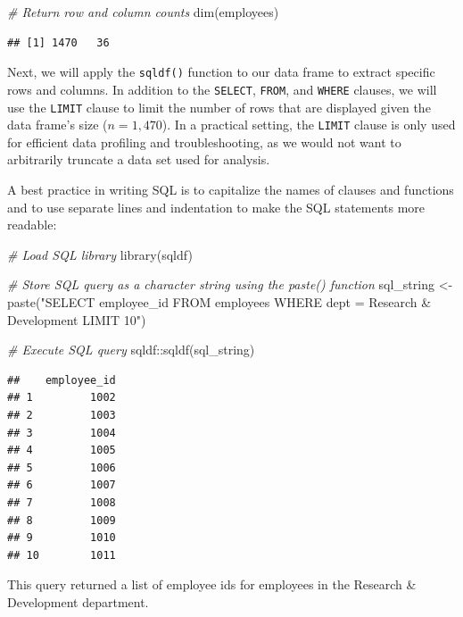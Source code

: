 \documentclass[
]{book}
\newenvironment{Shaded}{\begin{snugshade}}{\end{snugshade}}
\newcommand{\CommentTok}[1]{\textcolor[rgb]{0.56,0.35,0.01}{\textit{#1}}}
\newcommand{\FunctionTok}[1]{\textcolor[rgb]{0.00,0.00,0.00}{#1}}
\newcommand{\NormalTok}[1]{#1}
\newcommand{\OtherTok}[1]{\textcolor[rgb]{0.56,0.35,0.01}{#1}}
\newcommand{\SpecialCharTok}[1]{\textcolor[rgb]{0.00,0.00,0.00}{#1}}
\newcommand{\StringTok}[1]{\textcolor[rgb]{0.31,0.60,0.02}{#1}}
\begin{document}
\begin{Shaded}
\begin{Highlighting}[]
\CommentTok{\# Return row and column counts}
\FunctionTok{dim}\NormalTok{(employees)}
\end{Highlighting}
\end{Shaded}

\begin{verbatim}
## [1] 1470   36
\end{verbatim}

Next, we will apply the \texttt{sqldf()} function to our data frame to extract specific rows and columns. In addition to the \texttt{SELECT}, \texttt{FROM}, and \texttt{WHERE} clauses, we will use the \texttt{LIMIT} clause to limit the number of rows that are displayed given the data frame's size (\(n = 1,470\)). In a practical setting, the \texttt{LIMIT} clause is only used for efficient data profiling and troubleshooting, as we would not want to arbitrarily truncate a data set used for analysis.

A best practice in writing SQL is to capitalize the names of clauses and functions and to use separate lines and indentation to make the SQL statements more readable:

\begin{Shaded}
\begin{Highlighting}[]
\CommentTok{\# Load SQL library}
\FunctionTok{library}\NormalTok{(sqldf)}

\CommentTok{\# Store SQL query as a character string using the paste() function}
\NormalTok{sql\_string }\OtherTok{\textless{}{-}} \FunctionTok{paste}\NormalTok{(}\StringTok{"SELECT}
\StringTok{                      employee\_id}
\StringTok{                    FROM}
\StringTok{                      employees}
\StringTok{                    WHERE}
\StringTok{                      dept = \textquotesingle{}Research \& Development\textquotesingle{}}
\StringTok{                    LIMIT 10"}\NormalTok{)}

\CommentTok{\# Execute SQL query}
\NormalTok{sqldf}\SpecialCharTok{::}\FunctionTok{sqldf}\NormalTok{(sql\_string)}
\end{Highlighting}
\end{Shaded}

\begin{verbatim}
##    employee_id
## 1         1002
## 2         1003
## 3         1004
## 4         1005
## 5         1006
## 6         1007
## 7         1008
## 8         1009
## 9         1010
## 10        1011
\end{verbatim}

This query returned a list of employee ids for employees in the Research \& Development department.
\end{document}

